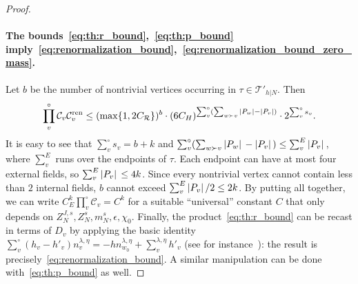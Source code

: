 \documentclass[a4paper, 11pt]{article}
\newcommand{\ren}{\mathcal{R}}								%
\newcommand{\trees}{\mathcal{T}}							%
\theoremstyle{thm}
\begin{document}
\begin{proof}
\paragraph{The bounds~\eqref{eq:th:r_bound},~\eqref{eq:th:p_bound} imply~\eqref{eq:renormalization_bound},~\eqref{eq:renormalization_bound_zero_mass}.} Let $b$ be the number of nontrivial vertices occurring in $\tau \in \trees'_{h|N}$. Then
\begin{equation}
\prod^\circ_v \mathcal{C}_v \mathcal{C}^{\textup{ren}}_v \le (\max \lbrace 1, 2 C_\ren \rbrace)^b \cdot (6C_H)^{\sum_v^\circ (\sum_{w \succ v} \abs* {P_w} - \abs*{P_v})} \cdot 2^{\sum^\circ_v s_v}.
\end{equation}
It is easy to see that $\sum^\circ_v s_v = b + k$ and $\sum_v^\circ (\sum_{w \succ v} \abs* {P_w} - \abs*{P_v}) \le \sum^E_v \abs*{P_v}$, where $\sum^E_v$ runs over the endpoints of $\tau$. Each endpoint can have at most four external fields, so $\sum^E_v \abs*{P_v} \le 4k$. Since every nontrivial vertex cannot contain less than $2$ internal fields, $b$ cannot exceed $\sum^E_v \abs*{P_v}/2 \le 2k$. By putting all together, we can write $C_E^k \prod^\circ_v \mathcal{C}_v = C^k$ for a suitable ``universal'' constant $C$ that only depends on $Z^{J, s}_N, Z^s_N, m^s_N, \epsilon, \chi_0$. Finally, the product~\eqref{eq:th:r_bound} can be recast in terms of $D_v$ by applying the basic identity $\sum_v^\circ (h_v - h'_v) n^{\lambda, \eta}_v = -h n^{\lambda, \eta}_{w_0} + \sum_v^{\lambda, \eta} h'_v$ (see for instance~\cite[Section III]{Mastropietro_2024}): the result is precisely~\eqref{eq:renormalization_bound}. A similar manipulation can be done with~\eqref{eq:th:p_bound} as well.


\end{proof}
\end{document}

